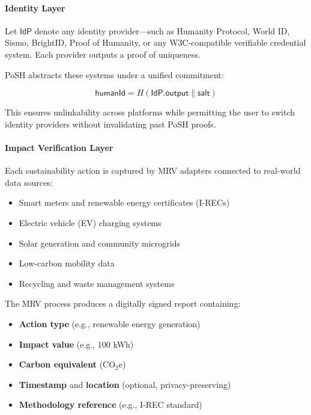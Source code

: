 \documentclass{article}
\begin{document}
\paragraph{Identity Layer}

Let $\textsf{IdP}$ denote any identity provider---such as Humanity Protocol, World ID, Sismo, BrightID, Proof of Humanity, or any W3C-compatible verifiable credential system. Each provider outputs a proof of uniqueness.

PoSH abstracts these systems under a unified commitment:

\begin{equation}
\mathsf{humanId} = H(\textsf{IdP.output} \parallel \textsf{salt})
\end{equation}

This ensures unlinkability across platforms while permitting the user to switch identity providers without invalidating past PoSH proofs.

\paragraph{Impact Verification Layer}

Each sustainability action is captured by MRV adapters connected to real-world data sources:

\begin{itemize}
\item Smart meters and renewable energy certificates (I-RECs)
\item Electric vehicle (EV) charging systems
\item Solar generation and community microgrids
\item Low-carbon mobility data
\item Recycling and waste management systems
\end{itemize}

The MRV process produces a digitally signed report containing:

\begin{itemize}
\item \textbf{Action type} (e.g., renewable energy generation)
\item \textbf{Impact value} (e.g., 100 kWh)
\item \textbf{Carbon equivalent} ($\text{CO}_2\text{e}$)
\item \textbf{Timestamp} and \textbf{location} (optional, privacy-preserving)
\item \textbf{Methodology reference} (e.g., I-REC standard)
\end{itemize}
\end{document}
